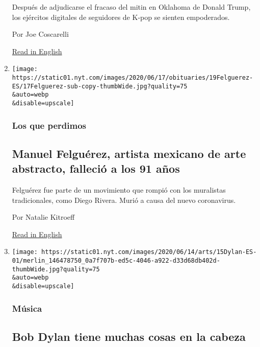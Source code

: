 \begin{enumerate}
  Después de adjudicarse el fracaso del mitin en Oklahoma de Donald
  Trump, los ejércitos digitales de seguidores de K-pop se sienten
  empoderados.

  Por Joe Coscarelli

  \href{https://www.nytimes.com/2020/06/22/arts/music/k-pop-fans-trump-politics.html}{Read
  in English}
\item
  \href{/es/2020/06/18/espanol/cultura/muere-covid-manuel-felguerez.html}{}

  \texttt{[image: https://static01.nyt.com/images/2020/06/17/obituaries/19Felguerez-ES/17Felguerez-sub-copy-thumbWide.jpg?quality=75\\\&auto=webp\\\&disable=upscale]}

  \hypertarget{los-que-perdimos}{%
  \subsubsection{Los que perdimos}\label{los-que-perdimos}}

  \hypertarget{manuel-felguuxe9rez-artista-mexicano-de-arte-abstracto-falleciuxf3-a-los-91-auxf1os}{%
  \subsection{Manuel Felguérez, artista mexicano de arte abstracto,
  falleció a los 91
  años}\label{manuel-felguuxe9rez-artista-mexicano-de-arte-abstracto-falleciuxf3-a-los-91-auxf1os}}

  Felguérez fue parte de un movimiento que rompió con los muralistas
  tradicionales, como Diego Rivera. Murió a causa del nuevo coronavirus.

  Por Natalie Kitroeff

  \href{https://www.nytimes.com/2020/06/17/arts/manuel-felguerez-dead-coronavirus.html}{Read
  in English}
\item
  \href{/es/2020/06/15/espanol/cultura/Bob-dylan-rough-rowdy-days.html}{}

  \texttt{[image: https://static01.nyt.com/images/2020/06/14/arts/15Dylan-ES-01/merlin\_146478750\_0a7f707b-ed5c-4046-a922-d33d68db402d-thumbWide.jpg?quality=75\\\&auto=webp\\\&disable=upscale]}

  \hypertarget{muxfasica-2}{%
  \subsubsection{Música}\label{muxfasica-2}}

  \hypertarget{bob-dylan-tiene-muchas-cosas-en-la-cabeza}{%
  \subsection{Bob Dylan tiene muchas cosas en la
  cabeza}\label{bob-dylan-tiene-muchas-cosas-en-la-cabeza}}


\end{enumerate}
